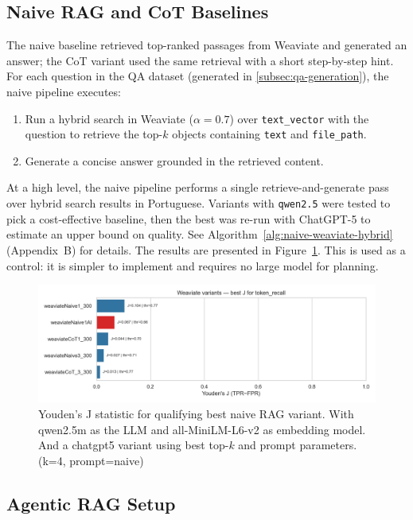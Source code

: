 \subsection{Naive RAG and CoT Baselines}
\label{sec:naive-rag-and-cot-baseline}
The naive baseline retrieved top-ranked passages from Weaviate and generated an answer; the CoT variant used the same retrieval with a short step-by-step hint.
For each question in the \gls{QA} dataset (generated in \ref{subsec:qa-generation}), the naive pipeline executes:
\begin{enumerate}
    \item Run a hybrid search in Weaviate (\(\alpha = 0.7\)) over \texttt{text\_vector} with the question to retrieve the top-$k$ objects containing \texttt{text} and \texttt{file\_path}.
    \item Generate a concise answer grounded in the retrieved content.
\end{enumerate}

At a high level, the naive pipeline performs a single retrieve-and-generate pass over hybrid search results in Portuguese. Variants with \texttt{qwen2.5} were tested to pick a cost-effective baseline, then the best was re-run with ChatGPT-5 to estimate an upper bound on quality. See Algorithm~\ref{alg:naive-weaviate-hybrid} (Appendix~B) for details.
The results are presented in Figure~\ref{fig:weaviate_test}.
This is used as a control: it is simpler to implement and requires no large model for planning.
\begin{figure}
    \centering
    \includegraphics[width=1\linewidth]{Figures/10_weaviate_best_j_token_recall.png}
    \caption{Youden's J statistic for qualifying best naive \gls{RAG} variant. With qwen2.5m as the \gls{LLM} and all-MiniLM-L6-v2 as embedding model. And a chatgpt5 variant using best top-$k$ and prompt parameters.(k=4, prompt=naive)}
    \label{fig:weaviate_test}
\end{figure}
\subsection{Agentic RAG Setup}
\label{sec:agentic-test}

